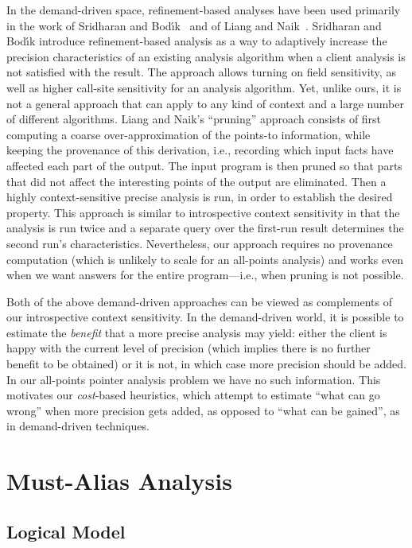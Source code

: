 In the demand-driven space, refinement-based analyses have been used primarily in the work of Sridharan and Bod\'{\i}k~\cite{pldi:2006:Sridharan} and of Liang and Naik~\cite{pldi:2011:Liang}. Sridharan and Bod\'{\i}k introduce refinement-based analysis as a way to adaptively increase the precision characteristics of an existing analysis algorithm when a client analysis is not satisfied with the result. The approach allows turning on field sensitivity, as well as higher call-site sensitivity for an analysis algorithm. Yet, unlike ours, it is not a general approach that can apply to any kind of context and a large number of different algorithms. Liang and Naik's ``pruning'' approach consists of first computing a coarse over-approximation of the points-to information, while keeping the provenance of this derivation, i.e., recording which input facts have affected each part of the output. The input program is then pruned so that parts that did not affect the interesting points of the output are eliminated. Then a highly context-sensitive precise analysis is run, in order to establish the desired property. This approach is similar to introspective context sensitivity in that the analysis is run twice and a separate query over the first-run result determines the second run's characteristics. Nevertheless, our approach requires no provenance computation (which is unlikely to scale for an all-points analysis) and works even when we want answers for the entire program---i.e., when pruning is not possible.

Both of the above demand-driven approaches can be viewed as complements of our introspective context sensitivity. In the demand-driven world, it is possible to estimate the \emph{benefit} that a more precise analysis may yield: either the client is happy with the current level of precision (which implies there is no further benefit to be obtained) or it is not, in which case more precision should be added. In our all-points pointer analysis problem we have no such information. This motivates our \emph{cost}-based heuristics, which attempt to estimate ``what can go wrong'' when more precision gets added, as opposed to ``what can be gained'', as in demand-driven techniques.



\section{Must-Alias Analysis}

\subsection*{Logical Model}


